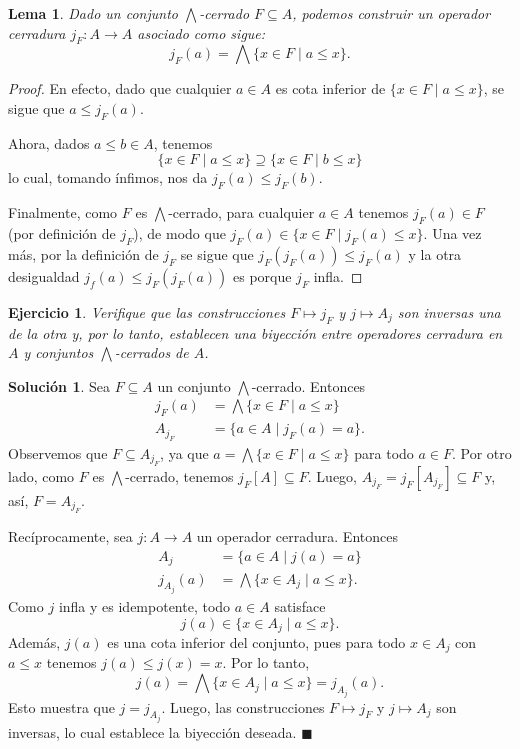 \documentclass[12pt,letterpaper,titlepage]{article}
\newcommand{\xqed}[1]{%
  \leavevmode\unskip\penalty9999 \hbox{}\nobreak\hfill
  \quad\hbox{\ensuremath{#1}}}
\newtheorem{exe}{Ejercicio}
\newtheorem{lemma}{Lema}
\theoremstyle{definition}
\newtheorem*{soltemp}{Solución}
\newenvironment{sol}[1]{%
    \begin{soltemp}#1}{%
    \xqed{\blacksquare}\end{soltemp}%
}
\newcommand\Inf{\bigwedge}
\newcommand\<{\langle}
\renewcommand\>{\rangle}
\begin{document}
\begin{lemma}
Dado un conjunto $\Inf$-cerrado $F\subseteq A$, podemos construir un
operador cerradura $j_F:A\to A$ asociado como sigue:
\[
    j_F(a) = \Inf\{x\in F \mid a\leq x\}
.\]
\end{lemma}
\begin{proof}
En efecto, dado que cualquier $a\in A$ es cota inferior de
$\{x\in F \mid a\leq x\}$, se sigue que $a\leq j_F(a)$.

Ahora, dados $a\leq b\in A$, tenemos
\[
    \{x\in F \mid a\leq x\} \supseteq \{x\in F \mid b\leq x\}
\]
lo cual, tomando ínfimos, nos da $j_F(a) \leq j_F(b)$.

Finalmente, como $F$ es $\Inf$-cerrado, para cualquier $a\in A$
tenemos $j_F(a)\in F$ (por definición de $j_F$),
de modo que $j_F(a) \in\{x\in F \mid j_F(a) \leq x\}$.
Una vez más, por la definición de $j_F$ se sigue que $j_F(j_F(a)) \leq j_F(a)$
y la otra desigualdad $j_f(a)\leq j_F(j_F(a))$ es porque $j_F$ infla.
\end{proof}
\begin{exe}%
    Verifique que las construcciones $F\mapsto j_F$
    y $j\mapsto A_j$ son inversas una de la otra y, por lo tanto,
    establecen una biyección entre operadores
    cerradura en $A$ y conjuntos $\Inf$-cerrados de $A$.
\end{exe}
\begin{sol}
    Sea $F\subseteq A$ un conjunto $\Inf$-cerrado.
    Entonces
    \begin{align*}
        j_F(a) &= \Inf\{x\in F \mid a\leq x\} \\
        A_{j_F} &= \{a\in A \mid j_F(a)=a\}.
    \end{align*}
    Observemos que $F\subseteq A_{j_F}$, ya que
    $a=\Inf\{x\in F\mid a\leq x\}$ para todo $a\in F$.
    Por otro lado,
    como $F$ es $\Inf$-cerrado, tenemos $j_F[A]\subseteq F$.
    Luego, $A_{j_F}=j_F[A_{j_F}] \subseteq F$ y, así, $F=A_{j_F}$.
    
    Recíprocamente, sea $j:A\to A$ un operador cerradura.
    Entonces
    \begin{align*}
        A_j &= \{a\in A \mid j(a)=a \} \\
        j_{A_j}(a) &= \Inf\{x\in A_j \mid a\leq x\}.
    \end{align*}
    Como $j$ infla y es idempotente, todo $a\in A$ satisface
    \[
        j(a) \in \{x\in A_j \mid a\leq x\}
    .\]
    Además, $j(a)$ es una cota inferior del conjunto,
    pues para todo
    $x\in A_j$ con $a\leq x$ tenemos $j(a)\leq j(x)=x$.
    Por lo tanto,
    \[
        j(a) = \Inf\{x\in A_j \mid a\leq x\} = j_{A_j}(a)
    .\]
    Esto muestra que $j=j_{A_j}$.
    Luego, las construcciones $F\mapsto j_F$ y $j\mapsto A_j$
    son inversas, lo cual establece la biyección deseada.
\end{sol}
\end{document}
